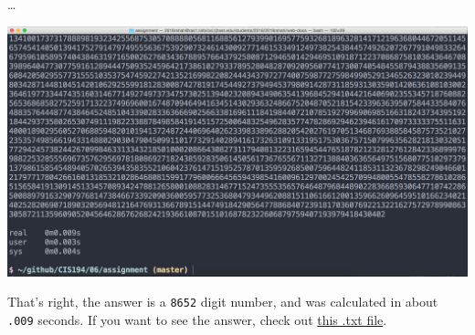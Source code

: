 \documentclass[12pt]{article}
\begin{document}
	\ldots\newline{}

	\includegraphics[width=6in]{Fibonacci_ss_2}

	That's right, the answer is a \texttt{8652} digit number, and was
	calculated in about \texttt{.009} seconds. If you want to see the
	answer, check out \href{http://www.rshah.org/blog/resources/week-06-of-cis194/Fibonacci_answer.txt}{this .txt file}.
\end{document}
